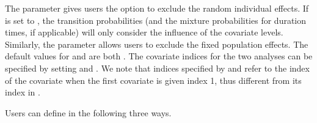 {The  parameter gives users the option to exclude the random individual effects. 
If  is set to , the transition probabilities (and the mixture probabilities for {duration times}, if applicable) will only consider the influence of the covariate levels.} 
Similarly, the  parameter allows users to exclude the fixed population effects. 
The default values for  and  are both .
The covariate indices for the two analyses can be specified by setting  and  . 
We note that indices specified by  and   refer to the index of the covariate when the first covariate is given index 1,  thus different from its index in .

Users can define  in the following three ways. 


